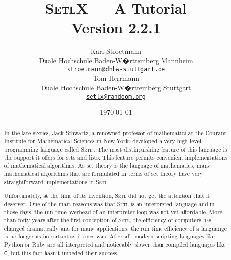 \documentclass[twoside]{report}
\title{\vspace*{-1cm}
  \epsfig{file=aleph0,scale=0.21} \\[0.5cm]
\textsc{SetlX} --- A Tutorial \\[0.5cm]
Version 2.2.1
}
\author{Karl Stroetmann \\[0.2cm]
Duale Hochschule Baden-W�rttemberg Mannheim \\[0.2cm]
\href{mailto:stroetmann@dhbw-stuttgart.de}{\texttt{stroetmann@dhbw-stuttgart.de}} \\[0.5cm]
 Tom Herrmann  \\[0.2cm]
Duale Hochschule Baden-W�rttemberg Stuttgart  \\[0.2cm]
\href{mailto:setlx@randoom.org}{\texttt{setlx@randoom.org}}
}
\date{\today}
\begin{document}
\maketitle

\begin{abstract}
  In the late sixties, Jack Schwartz, a renowned professor of mathematics at the Courant Institute for
Mathematical Sciences in New York, developed a very high level programming language called
\textsc{Setl} 
\cite{schwartz:1970, setl86}.  The most distinguishing feature of this language is the
support it offers for sets and lists.   This feature permits convenient implementations of
mathematical algorithms:  As set theory is the language of mathematics, many mathematical
algorithms that are formulated in terms of set theory have very straightforward implementations in
\textsc{Setl}. 

Unfortunately, at the time of its invention, \textsc{Setl} did not get the attention that it deserved.
One of the main reasons was that \textsc{Setl} is an interpreted language and in those
days, the run time overhead of an interpreter loop was not yet affordable.  More than
forty years after the first conception of \textsc{Setl}, the efficiency of computers has changed
dramatically and for many applications, the run time efficiency of a languange is no
longer as important as it once was.  After all, 
modern scripting languages like Python \cite{vanRossum:95} or Ruby \cite{flanagan:2008}
are all interpreted and noticeably slower than compiled languages like \texttt{C}, but this
fact hasn't impeded their success. 


\end{abstract}
\end{document}
